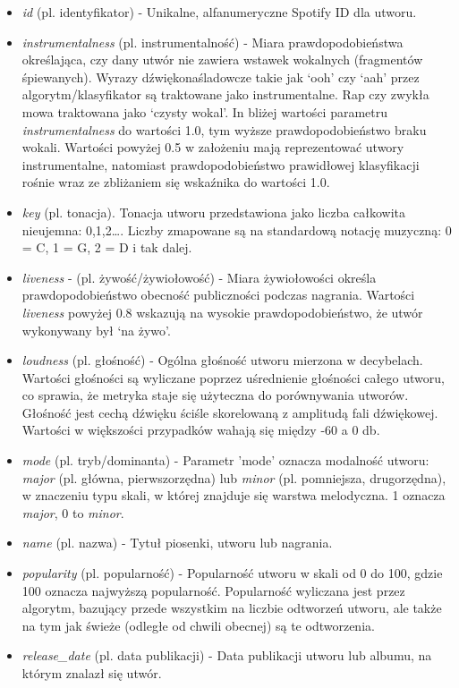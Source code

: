\documentclass[a4paper,12pt]{article}
\numberwithin{figure}{section}
\begin{document}
\begin{itemize}
        \item \textit{id} (pl. identyfikator) - Unikalne, alfanumeryczne Spotify ID dla utworu.
        \item \textit{instrumentalness} (pl. instrumentalność) - Miara prawdopodobieństwa określająca, czy dany utwór nie zawiera wstawek wokalnych (fragmentów śpiewanych). Wyrazy dźwiękonaśladowcze takie jak `ooh' czy `aah' przez algorytm/klasyfikator są traktowane jako instrumentalne. Rap czy zwykła mowa traktowana jako `czysty wokal'. In bliżej wartości parametru \textit{instrumentalness} do wartości 1.0, tym wyższe prawdopodobieństwo braku wokali. Wartości powyżej 0.5 w założeniu mają reprezentować utwory instrumentalne, natomiast prawdopodobieństwo prawidłowej klasyfikacji rośnie wraz ze zbliżaniem się wskaźnika do wartości 1.0.
        \item \textit{key} (pl. tonacja). Tonacja utworu przedstawiona jako liczba całkowita nieujemna: 0,1,2\ldots . Liczby zmapowane są na standardową notację muzyczną: 0 = C, 1 = G, 2 = D i tak dalej.
        \item \textit{liveness} - (pl. żywość/żywiołowość) - Miara żywiołowości określa prawdopodobieństwo obecność publiczności podczas nagrania. Wartości \textit{liveness} powyżej 0.8 wskazują na wysokie prawdopodobieństwo, że utwór wykonywany był `na żywo'.
        \item \textit{loudness} (pl. głośność) - Ogólna głośność utworu mierzona w decybelach. Wartości głośności są wyliczane poprzez uśrednienie głośności całego utworu, co sprawia, że metryka staje się użyteczna do porównywania utworów. Głośność jest cechą dźwięku ściśle skorelowaną z amplitudą fali dźwiękowej. Wartości w większości przypadków wahają się między -60 a 0 db.
        \item \textit{mode} (pl. tryb/dominanta) - Parametr 'mode' oznacza modalność utworu: \textit{major} (pl. główna, pierwszorzędna) lub \textit{minor} (pl. pomniejsza, drugorzędna), w znaczeniu typu skali, w której znajduje się warstwa melodyczna. 1 oznacza \textit{major}, 0 to \textit{minor}.
        \item \textit{name} (pl. nazwa) - Tytuł piosenki, utworu lub nagrania.
        \item \textit{popularity} (pl. popularność) - Popularność utworu w skali od 0 do 100, gdzie 100 oznacza najwyższą popularność. Popularność wyliczana jest przez algorytm, bazujący przede wszystkim na liczbie odtworzeń utworu, ale także na tym jak świeże (odległe od chwili obecnej) są te odtworzenia.
        \item \textit{release\_date} (pl. data publikacji) - Data publikacji utworu lub albumu, na którym znalazł się utwór.

\end{itemize}
\end{document}
